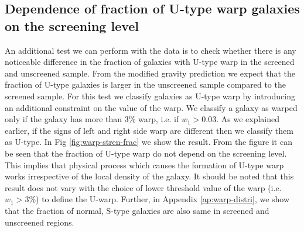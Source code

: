 \documentclass[useAMS,usenatbib,twocolumn]{mn2e}
\begin{document}
\subsection{Dependence of fraction of U-type warp galaxies on the screening
level}
An additional test we can perform with the data is to check whether there is
any noticeable difference in the fraction of galaxies with U-type warp in the
screened and unscreened sample. From the modified gravity prediction we expect
that the fraction of U-type galaxies is larger in the unscreened sample
compared to the screened sample. For this test we classify galaxies as U-type
warp by introducing an additional constraint on the value of the warp. We
classify a galaxy as warped only if the galaxy has more than 3\% warp, i.e. if
$w_1 > 0.03$. As we explained earlier, if the signs of left and right side warp
are different then we classify them as U-type. In Fig \ref{fig:warp-stren-frac}
we show the result. From the figure it can be seen that the fraction of U-type
warp do not depend on the screening level. This implies that physical process
which causes the formation of U-type warp works irrespective of the local
density of the galaxy. It should be noted that this result does not vary with
the choice of lower threshold value of the warp (i.e. $w_1 > 3$\%) to define
the U-warp. Further, in Appendix \ref{ap:warp-distri}, we show that the
fraction of normal, S-type galaxies are also same in screened and unscreened
regions.
\end{document}
